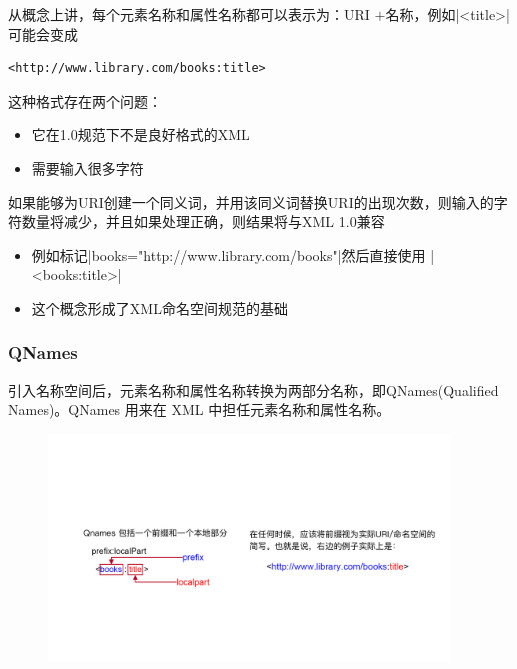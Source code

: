 从概念上讲，每个元素名称和属性名称都可以表示为：URI $+$名称，例如\sverb|<title>|\;可能会变成
\begin{lstlisting}
<http://www.library.com/books:title>
\end{lstlisting}
这种格式存在两个问题：
\vspace{-0.8em}
\begin{multicols}{2}
    \begin{itemize}
        \item 它在1.0规范下不是良好格式的XML
        \item 需要输入很多字符
    \end{itemize}
\end{multicols}
\vspace{-1em}

如果能够为URI创建一个同义词，并用该同义词替换URI的出现次数，则输入的字符数量将减少，并且如果处理正确，则结果将与XML 1.0兼容
\begin{itemize}
	\item 例如标记\sverb|books="http://www.library.com/books"|\;然后直接使用 \sverb|<books:title>|
	\item 这个概念形成了XML命名空间规范的基础
\end{itemize}


\subsubsection{QNames}
引入名称空间后，元素名称和属性名称转换为两部分名称，即QNames(Qualified Names)。QNames 用来在 XML 中担任元素名称和属性名称。
\begin{figure}[H]
    \vspace{-0.5em}
	\centering
	\includegraphics[width=0.95\textwidth]{images/Qnames.pdf}
    \vspace{-1em}
\end{figure}

